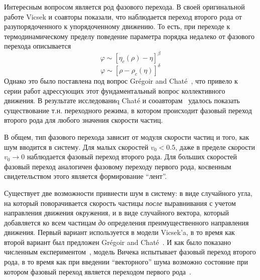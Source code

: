     Интересным вопросом является род фазового перехода. В своей оригинальной работе Vicsek и соавторы показали, что наблюдается переход второго рода от разупорядоченного к упорядоченному движению. То есть, при переходе к термодинамическому пределу поведение параметра порядка недалеко от фазового перехода описывается
    \begin{equation}
        \varphi \sim [\eta_c(\rho)-\eta]^\beta
    \end{equation}
    \begin{equation}
        \varphi \sim [\rho-\rho_c(\eta)]^\delta
    \end{equation}
    Однако это было поставлена под вопрос Gr\'egoir and Chat\'e~\cite{gregoire2004}, что привело к серии работ адрессующих этот фундаментальный вопрос коллективного движения. В результате исследованиq Chat\'e и сооавторам~\cite{chate2008} удалось показать существование т.н. переходного режима, в котором происходит фазовый переход второго рода для любого значения скорости частиц.

    В общем, тип фазового перехода зависит от модуля скорости частиц и того, как шум вводится в систему. Для малых скоростей $v_0 < 0.5$, даже в пределе скорости $v_0 \to 0$ наблюдается фазовый переход второго рода. Для больших скоростей фазовый переход аналогичен фазовому переходу первого рода, косвенным свидетельством этого является формирование ``лент''.\cite{huepe2008}

    Существует две возможности привнести шум в систему: в виде случайного угла, на который поворачивается скорость частицы \textit{после} выравнивания с учетом направления движения окружения, и в виде случайного вектора, который добавляется ко всем частицам \textit{до} определения преимущественного направления движения. Первый вариант используется в модели Vicsek'a, в то время как второй вариант был предложен Gr\'egoir and Chat\'e~\cite{gregoire2004}. И как было показано численным експериментом~\cite{baglietto2008}, модель Вичека испытывает фазовый переход второго рода, в то время как при введении ``векторного'' шума возможно состояние при котором фазовый переход является переходом первого рода~\cite{aldana2009}.
